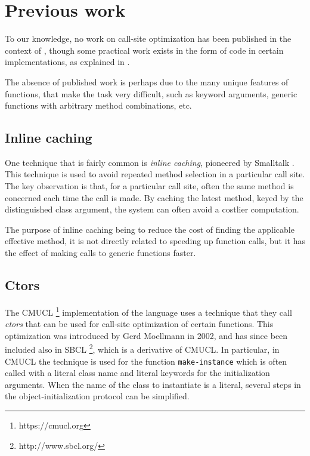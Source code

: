 \section{Previous work}

To our knowledge, no work on call-site optimization has been published
in the context of \commonlisp{}, though some practical work exists in
the form of code in certain implementations, as explained in
.

The absence of published work is perhaps due to the many unique
features of \commonlisp{} functions, that make the task very
difficult, such as keyword arguments, generic functions with arbitrary
method combinations, etc.

\subsection{Inline caching}

One technique that is fairly common is \emph{inline caching},
pioneered by Smalltalk \cite{Deutsch:1984:ES}.  This technique is used
to avoid repeated method selection in a particular call site.  The key
observation is that, for a particular call site, often the same method
is concerned each time the call is made.  By caching the latest
method, keyed by the distinguished class argument, the system can
often avoid a costlier computation.

The purpose of inline caching being to reduce the cost of finding the
applicable effective method, it is not directly related to speeding up
function calls, but it has the effect of making calls to generic
functions faster.

\subsection{Ctors}
\label{sec-previous-ctors}

The CMUCL%
\footnote{https://cmucl.org}
implementation of the \commonlisp{} language uses a
technique that they call \emph{ctors} that can be used for call-site
optimization of certain functions.  This optimization was introduced
by Gerd Moellmann in 2002, and has since been included also in SBCL%
\footnote{http://www.sbcl.org/},
which is a derivative of CMUCL.  In particular, in CMUCL the technique
is used for the function \texttt{make-instance} which is often called
with a literal class name and literal keywords for the initialization
arguments.  When the name of the class to instantiate is a literal,
several steps in the object-initialization protocol can be simplified.

